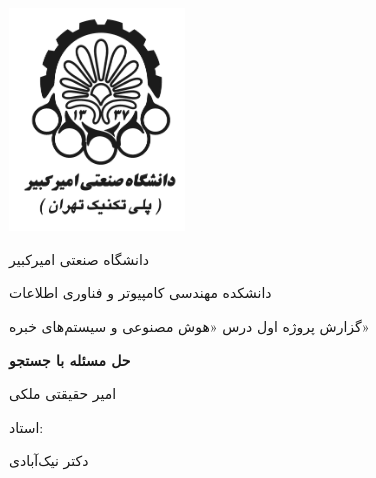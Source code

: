 	\begin{titlepage}
		\centering
		\includegraphics[width=0.35\textwidth]{Resources/logo.png}\par\vspace{1cm}
		{\scshape\LARGE دانشگاه صنعتی امیرکبیر \par}
		{\scshape\LARGE دانشکده مهندسی کامپیوتر و فناوری اطلاعات \par}
		\vspace{1cm}
		{\scshape\Large
			گزارش پروژه اول درس
			«هوش مصنوعی و سیستم‌های خبره»
			\par}
		\vspace{1.5cm}
		{\huge\bfseries 
	حل مسئله با جستجو
			\par}
		\vspace{2cm}
		{\Large امیر حقیقتی ملکی\par}
		\vfill
		استاد:\par
		دکتر نیک‌آبادی
		\vfill
		
		{\large {}\par}
	\end{titlepage}